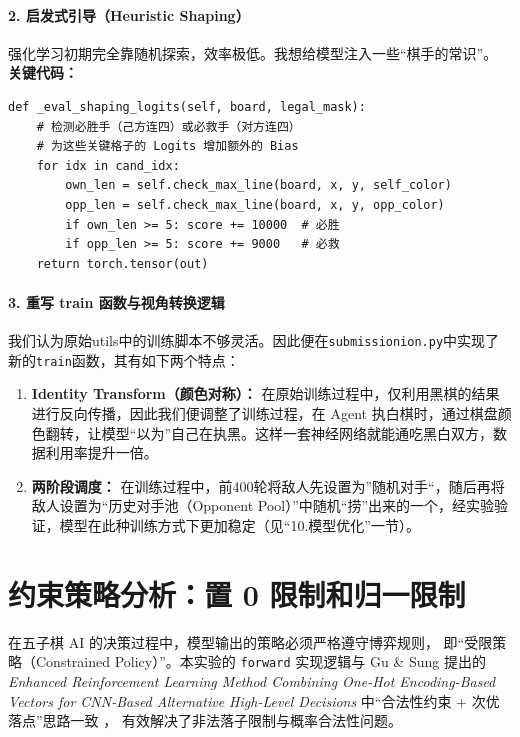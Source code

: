 \documentclass{article}
\begin{document}
\paragraph{2. 启发式引导（Heuristic Shaping）}
强化学习初期完全靠随机探索，效率极低。我想给模型注入一些“棋手的常识”。
\textbf{关键代码：}
\begin{lstlisting}
def _eval_shaping_logits(self, board, legal_mask):
    # 检测必胜手（己方连四）或必救手（对方连四）
    # 为这些关键格子的 Logits 增加额外的 Bias
    for idx in cand_idx:
        own_len = self.check_max_line(board, x, y, self_color)
        opp_len = self.check_max_line(board, x, y, opp_color)
        if own_len >= 5: score += 10000  # 必胜
        if opp_len >= 5: score += 9000   # 必救
    return torch.tensor(out)
\end{lstlisting}

\paragraph{3. 重写 train 函数与视角转换逻辑}
我们认为原始utils中的训练脚本不够灵活。因此便在\texttt{submissionion.py}中实现了新的\texttt{train}函数，其有如下两个特点： 
\begin{enumerate}
    \item \textbf{Identity Transform（颜色对称）：} 在原始训练过程中，仅利用黑棋的结果进行反向传播，因此我们便调整了训练过程，在 Agent 执白棋时，通过棋盘颜色翻转，让模型“以为”自己在执黑。这样一套神经网络就能通吃黑白双方，数据利用率提升一倍。
    \item \textbf{两阶段调度：} 在训练过程中，前400轮将敌人先设置为”随机对手“，随后再将敌人设置为“历史对手池（Opponent Pool）”中随机“捞”出来的一个，经实验验证，模型在此种训练方式下更加稳定（见“10.模型优化”一节）。
\end{enumerate}

\section{约束策略分析：置 0 限制和归一限制}

在五子棋 AI 的决策过程中，模型输出的策略必须严格遵守博弈规则，
即“受限策略（Constrained Policy）”。本实验的 \texttt{forward}
实现逻辑与 Gu \& Sung 提出的
\emph{Enhanced Reinforcement Learning Method Combining One-Hot Encoding-Based Vectors for CNN-Based Alternative High-Level Decisions}
中“合法性约束 + 次优落点”思路一致 \citep{gu2021onehot}，
有效解决了非法落子限制与概率合法性问题。
\end{document}
